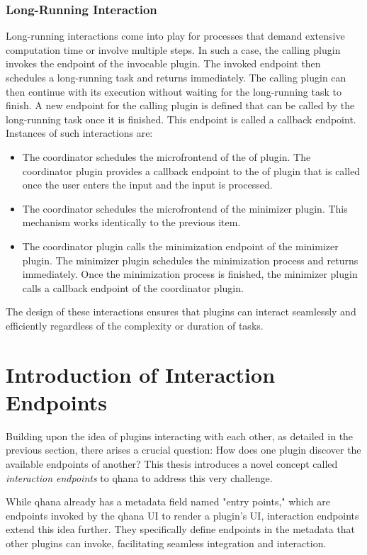 \documentclass[
  a4paper,  %
  twoside,  %
  bibliography=totoc,
  headsepline,
  cleardoublepage=empty,
  parskip=half,
  draft=false
]{scrbook}
\begin{document}
\subsubsection{Long-Running Interaction}

Long-running interactions come into play for processes that demand extensive computation time or involve multiple steps.
In such a case, the calling plugin invokes the endpoint of the invocable plugin.
The invoked endpoint then schedules a long-running task and returns immediately.
The calling plugin can then continue with its execution without waiting for the long-running task to finish.
A new endpoint for the calling plugin is defined that can be called by the long-running task once it is finished.
This endpoint is called a callback endpoint.
Instances of such interactions are:
\begin{itemize}
    \item The coordinator schedules the microfrontend of the \gls{of} plugin.
    The coordinator plugin provides a callback endpoint to the \gls{of} plugin that is called once the user enters the input and the input is processed.
    \item The coordinator schedules the microfrontend of the minimizer plugin.
    This mechanism works identically to the previous item.
    \item The coordinator plugin calls the minimization endpoint of the minimizer plugin.
    The minimizer plugin schedules the minimization process and returns immediately.
    Once the minimization process is finished, the minimizer plugin calls a callback endpoint of the coordinator plugin.
\end{itemize}
The design of these interactions ensures that plugins can interact seamlessly and efficiently regardless of the complexity or duration of tasks.

\section{Introduction of Interaction Endpoints}
\label{sec:introie}

Building upon the idea of plugins interacting with each other, as detailed in the previous section, there arises a crucial question:
How does one plugin discover the available endpoints of another?
This thesis introduces a novel concept called \textit{interaction endpoints} to \gls{qhana} to address this very challenge.

While \gls{qhana} already has a metadata field named "entry points," which are endpoints invoked by the \gls{qhana} UI to render a plugin's UI, interaction endpoints extend this idea further.
They specifically define endpoints in the metadata that other plugins can invoke, facilitating seamless integration and interaction.
\end{document}
